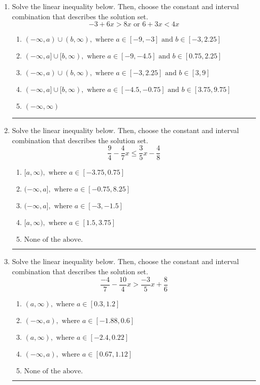 \documentclass[14pt]{extbook}
\newcommand{\litem}[1]{\item#1\hspace*{-1cm}\rule{\textwidth}{0.4pt}}
\begin{document}
\begin{enumerate}
\litem{
Solve the linear inequality below. Then, choose the constant and interval combination that describes the solution set.\[ -3 + 6 x > 8 x \text{ or } 6 + 3 x < 4 x \]\begin{enumerate}[label=\Alph*.]
\item \( (-\infty, a) \cup (b, \infty), \text{ where } a \in [-9, -3] \text{ and } b \in [-3, 2.25] \)
\item \( (-\infty, a] \cup [b, \infty), \text{ where } a \in [-9, -4.5] \text{ and } b \in [0.75, 2.25] \)
\item \( (-\infty, a) \cup (b, \infty), \text{ where } a \in [-3, 2.25] \text{ and } b \in [3, 9] \)
\item \( (-\infty, a] \cup [b, \infty), \text{ where } a \in [-4.5, -0.75] \text{ and } b \in [3.75, 9.75] \)
\item \( (-\infty, \infty) \)

\end{enumerate} }
\litem{
Solve the linear inequality below. Then, choose the constant and interval combination that describes the solution set.\[ \frac{9}{4} - \frac{4}{7} x \leq \frac{3}{5} x - \frac{4}{8} \]\begin{enumerate}[label=\Alph*.]
\item \( [a, \infty), \text{ where } a \in [-3.75, 0.75] \)
\item \( (-\infty, a], \text{ where } a \in [-0.75, 8.25] \)
\item \( (-\infty, a], \text{ where } a \in [-3, -1.5] \)
\item \( [a, \infty), \text{ where } a \in [1.5, 3.75] \)
\item \( \text{None of the above}. \)

\end{enumerate} }
\litem{
Solve the linear inequality below. Then, choose the constant and interval combination that describes the solution set.\[ \frac{-4}{7} - \frac{10}{4} x > \frac{-3}{5} x + \frac{8}{6} \]\begin{enumerate}[label=\Alph*.]
\item \( (a, \infty), \text{ where } a \in [0.3, 1.2] \)
\item \( (-\infty, a), \text{ where } a \in [-1.88, 0.6] \)
\item \( (a, \infty), \text{ where } a \in [-2.4, 0.22] \)
\item \( (-\infty, a), \text{ where } a \in [0.67, 1.12] \)
\item \( \text{None of the above}. \)


\end{enumerate}}
\end{enumerate}
\end{document}
